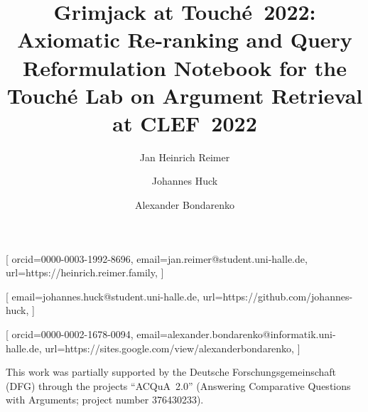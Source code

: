 \documentclass{ceurart}
\begin{document}

\title{%
  Grimjack at \texorpdfstring{Touch{\'e}~2022}{Touch{\'e} 2022}:\texorpdfstring{\\}{ }
  Axiomatic Re-ranking and Query Reformulation%
}
\title[mode=sub]{%
  Notebook for the Touché Lab on Argument Retrieval at CLEF\ 2022%
}

\author{Jan Heinrich Reimer}[
  orcid=0000-0003-1992-8696,
  email=jan.reimer@student.uni-halle.de,
  url=https://heinrich.reimer.family,
]
\author{Johannes Huck}[
  email=johannes.huck@student.uni-halle.de,
  url=https://github.com/johannes-huck,
]
\author{Alexander Bondarenko}[
  orcid=0000-0002-1678-0094,
  email=alexander.bondarenko@informatik.uni-halle.de,
  url=https://sites.google.com/view/alexanderbondarenko,
]

\address{%
  Martin-Luther-Universität Halle-Wittenberg,
  06099~Halle~(Saale), Germany
}



\maketitle








\begin{acknowledgments}
This work was partially supported by the Deutsche Forschungsgemeinschaft (DFG) through the projects ``ACQuA~2.0'' (Answering Comparative Questions with Arguments; project number 376430233).
\end{acknowledgments}


\end{document}
